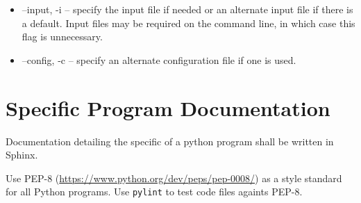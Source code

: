 \begin{itemize}
  \item --input, -i -- specify the input file if needed or an alternate
   input file if there is a default. Input files may be required on the
   command line, in which case this flag is unnecessary.

 \item --config, -c -- specify an alternate configuration file if one
   is used.
\end{itemize}


\section{Specific Program Documentation}

Documentation detailing the specific of a python program shall be
written in Sphinx.

Use PEP-8  (\url{https://www.python.org/dev/peps/pep-0008/}) as a
style standard for all Python programs. Use \texttt{pylint} to test
code files againts PEP-8. 


